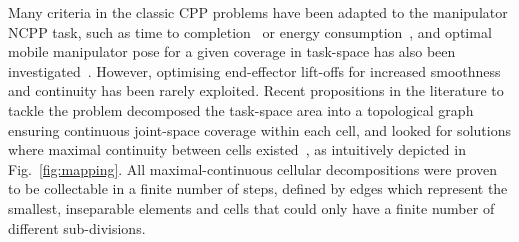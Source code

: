 \documentclass[conference]{IEEEtran}
\begin{document}
Many criteria in the classic CPP problems have been adapted to the manipulator NCPP task, such as time to completion~\cite{lu2020time} or energy consumption~\cite{mei2004energy}, and optimal mobile manipulator pose for a given coverage in task-space has also been investigated~\cite{paus2017a}. However, optimising  end-effector lift-offs for increased smoothness and continuity has been rarely exploited. %
Recent propositions in the literature to tackle the problem decomposed the task-space area into a %
topological graph ensuring continuous joint-space coverage within each cell, and looked for solutions where maximal continuity between cells existed~\cite{Yang2020Cellular}, as intuitively depicted in Fig.~\ref{fig:mapping}. 
All maximal-continuous cellular decompositions were proven to be collectable in a finite number of steps, defined by edges which represent the smallest, inseparable elements and cells that could only have a finite number of different sub-divisions.  

\end{document}
